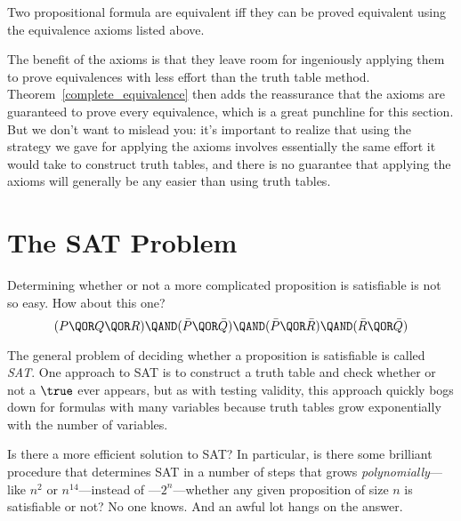 \begin{theorem}
\label{complete_equivalence}
Two propositional formula are equivalent iff they can be proved
equivalent using the equivalence axioms listed above.
\end{theorem}

The benefit of the axioms is that they leave room for ingeniously
applying them to prove equivalences with less effort than the truth
table method.  Theorem~\ref{complete_equivalence} then adds the
reassurance that the axioms are guaranteed to prove every equivalence,
which is a great punchline for this section.  But we don't want to
mislead you: it's important to realize that using the strategy we gave
for applying the axioms involves essentially the same effort it would
take to construct truth tables, and there is no guarantee that applying the
axioms will generally be any easier than using truth tables.

\begin{problems}
\practiceproblems
{}

\classproblems
{}

\homeworkproblems
{}

\end{problems}

\section{The SAT Problem}\label{SAT_sec}
Determining whether or not a more complicated proposition is
satisfiable is not so easy.  How about this one?
%
\[
(P \QOR Q \QOR R) \QAND (\bar P \QOR \bar Q)
                  \QAND (\bar P \QOR \bar R)
                  \QAND (\bar R \QOR \bar Q)
\]

The general problem of deciding whether a proposition is
satisfiable is called%
\emph{SAT}.  One approach to SAT is to construct a truth table 
and check whether or not a $\true$ ever
appears, but as with testing validity, this approach quickly bogs down
for formulas with many variables because truth tables grow
exponentially with the number of variables.

Is there a more efficient solution to SAT?  In particular, is
there some brilliant procedure that determines SAT in a number of steps
that grows \emph{polynomially}---like
$n^2$ or $n^{14}$---instead of \emph{}---$2^n$---whether any given proposition of size
$n$ is satisfiable or not?  No one knows.  And an awful lot hangs on
the answer.

